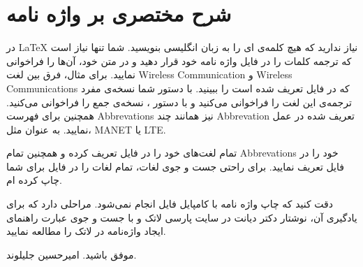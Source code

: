 \chapter{شرح مختصری بر واژه نامه}
در
\LaTeX
نیاز ندارید که هیچ کلمه‌ی ای را به زبان انگلیسی بنویسید. شما تنها نیاز است که ترجمه کلمات را در فایل واژه نامه خود قرار دهید و در متن خود، آن‌ها را فراخوانی نمایید. برای مثال، فرق بین لغت 
\gls{Wireless Communication}
و 
\glspl{Wireless Communication}
که در فایل 
تعریف شده است را ببینید. با دستور 
شما نسخه‌ی مفرد ترجمه‌ی این لغت را فراخوانی می‌کنید و با دستور 
،
نسخه‌ی جمع را فراخوانی می‌کنید. همچنین برای فهرست 
\glspl{Abbrevation}
نیز همانند چند 
\gls{Abbrevation}
تعریف شده در 
عمل نمایید. 
به عنوان مثل، 
\gls{MANET}
یا 
\gls{LTE}.
\begin{note}
	تمام لغت‌های خود را در فایل 
	تعریف کرده و همچنین تمام 
	\glspl{Abbrevation}
	خود را در فایل 
	تعریف نمایید. برای راحتی جست و جوی لغات، تمام لغات را در فایل 
	برای شما چاپ کرده ام. 
\end{note}
\begin{warning}
	دقت کنید که چاپ واژه نامه با کامپایل فایل انجام نمی‌شود. مراحلی دارد که برای یادگیری آن، نوشتار دکتر دیانت  در سایت پارسی لاتک و با جست و جوی عبارت راهنمای ایجاد واژه‌نامه در لاتک را مطالعه نمایید.
\end{warning}
موفق باشید. 
امیرحسین جلیلوند.